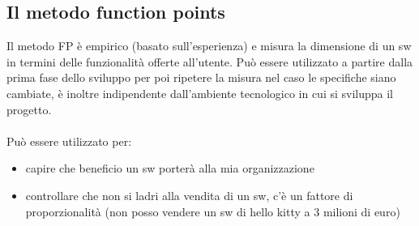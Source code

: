 \documentclass[a4paper,12pt]{report}
\begin{document}
	\subsection{Il metodo function points}
	Il metodo FP è empirico (basato sull'esperienza) e misura la dimensione di un sw in termini delle funzionalità offerte all'utente. Può essere utilizzato a partire dalla prima fase dello sviluppo per poi ripetere la misura nel caso le specifiche siano cambiate, è inoltre indipendente dall'ambiente tecnologico in cui si sviluppa il progetto. \\ \\
	Può essere utilizzato per:
	\begin{itemize}
		\item capire che beneficio un sw porterà alla mia organizzazione
		\item controllare che non si ladri alla vendita di un sw, c'è un fattore di proporzionalità (non posso vendere un sw di hello kitty a 3 milioni di euro)
	\end{itemize}
\end{document}
